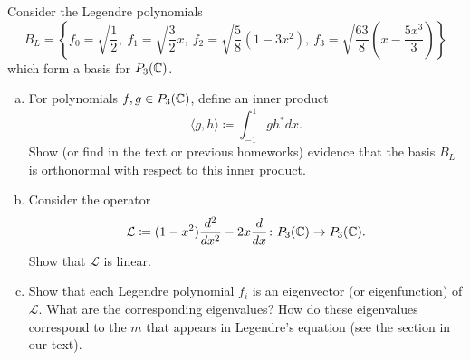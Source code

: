 \documentclass[12pt]{article} %
\begin{document}
\begin{problem} Consider the Legendre polynomials
    \[
        B_L = \left\{f_0 = \sqrt{\frac{1}{2}}, ~ f_1 = \sqrt{\frac{3}{2}}x, ~ f_2 = \sqrt{\frac{5}{8}} (1-3x^2),~ f_3=\sqrt{\frac{63}{8}}\left(x-\frac{5x^3}{3}\right) \right\}
    \]
which form a basis for $P_3(\mathbb{C})$.
\begin{enumerate}[(a)]
    \item For polynomials $f,g\in P_3(\mathbb{C})$, define an inner product
    \[
\langle g,h\rangle \coloneqq \int_{-1}^1 gh^* dx.
\]
    Show (or find in the text or previous homeworks) evidence that the basis $B_L$ is orthonormal with respect to this inner product.
    \item Consider the operator
    \[
    \mathcal{L} \coloneqq (1-x^2)\frac{d^2}{dx^2} - 2x \frac{d}{dx} \colon P_3(\mathbb{C}) \to P_3(\mathbb{C}).
    \]
    Show that $\mathcal{L}$ is linear.
    \item Show that each Legendre polynomial $f_i$ is an eigenvector (or eigenfunction) of $\mathcal{L}$. What are the corresponding eigenvalues? How do these eigenvalues correspond to the $m$ that appears in Legendre's equation (see the section in our text).
\end{enumerate}
\end{problem}
\end{document}
